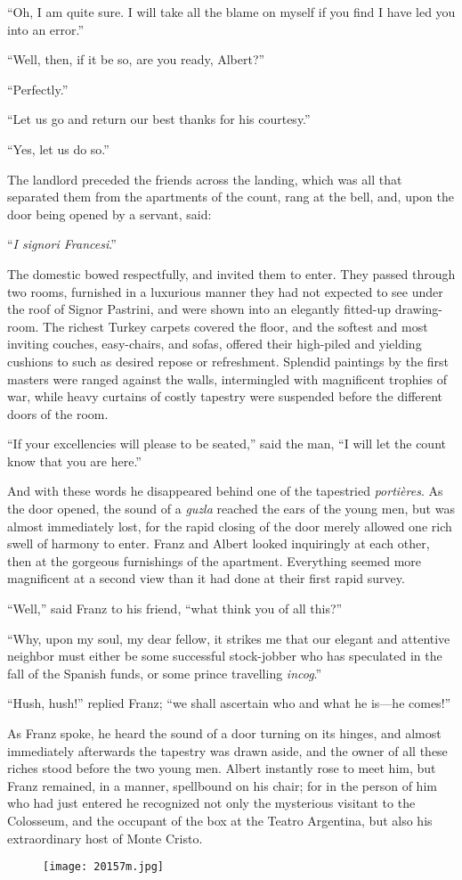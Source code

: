 “Oh, I am quite sure. I will take all the blame on myself if you find I
have led you into an error.”

“Well, then, if it be so, are you ready, Albert?”

“Perfectly.”

“Let us go and return our best thanks for his courtesy.”

“Yes, let us do so.”

The landlord preceded the friends across the landing, which was all
that separated them from the apartments of the count, rang at the bell,
and, upon the door being opened by a servant, said:

“\textit{I signori Francesi}.”

The domestic bowed respectfully, and invited them to enter. They passed
through two rooms, furnished in a luxurious manner they had not
expected to see under the roof of Signor Pastrini, and were shown into
an elegantly fitted-up drawing-room. The richest Turkey carpets covered
the floor, and the softest and most inviting couches, easy-chairs, and
sofas, offered their high-piled and yielding cushions to such as
desired repose or refreshment. Splendid paintings by the first masters
were ranged against the walls, intermingled with magnificent trophies
of war, while heavy curtains of costly tapestry were suspended before
the different doors of the room.

“If your excellencies will please to be seated,” said the man, “I will
let the count know that you are here.”

And with these words he disappeared behind one of the tapestried
\textit{portières}. As the door opened, the sound of a \textit{guzla} reached the
ears of the young men, but was almost immediately lost, for the rapid
closing of the door merely allowed one rich swell of harmony to enter.
Franz and Albert looked inquiringly at each other, then at the gorgeous
furnishings of the apartment. Everything seemed more magnificent at a
second view than it had done at their first rapid survey.

“Well,” said Franz to his friend, “what think you of all this?”

“Why, upon my soul, my dear fellow, it strikes me that our elegant and
attentive neighbor must either be some successful stock-jobber who has
speculated in the fall of the Spanish funds, or some prince travelling
\textit{incog}.”

“Hush, hush!” replied Franz; “we shall ascertain who and what he is—he
comes!”

As Franz spoke, he heard the sound of a door turning on its hinges, and
almost immediately afterwards the tapestry was drawn aside, and the
owner of all these riches stood before the two young men. Albert
instantly rose to meet him, but Franz remained, in a manner, spellbound
on his chair; for in the person of him who had just entered he
recognized not only the mysterious visitant to the Colosseum, and the
occupant of the box at the Teatro Argentina, but also his extraordinary
host of Monte Cristo.

\begin{figure}[h]
\texttt{[image: 20157m.jpg]}
\end{figure}
